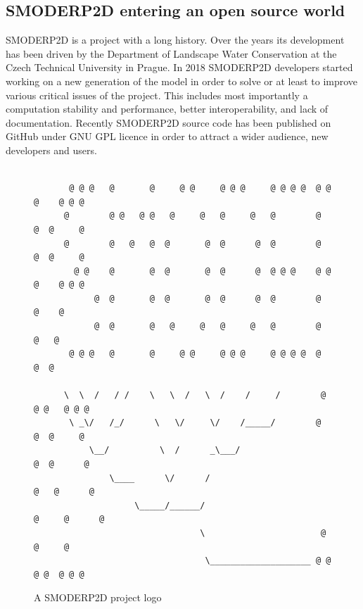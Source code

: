 \subsection{SMODERP2D entering an open source world}\label{ref:open_source_providers}

SMODERP2D is a project with a long history. Over the years its
development has been driven by the Department of Landscape Water
Conservation at the Czech Technical University in Prague. In 2018
SMODERP2D developers started working on a new generation of the model
in order to solve or at least to improve various critical issues of
the project. This includes most importantly a computation stability
and performance, better interoperability, and lack of
documentation. Recently SMODERP2D source code has been published on
GitHub \cite{smoderp2d-github-2019} under GNU GPL licence in order to
attract a wider audience, new developers and users.

\begin{figure}[ht!]
  {\tiny
\begin{verbatim}

       @ @ @   @       @     @ @     @ @ @     @ @ @ @  @ @ @    @ @ @
      @        @ @   @ @   @     @   @     @   @        @     @  @     @
      @        @   @   @  @       @  @      @  @        @     @  @     @
        @ @    @       @  @       @  @      @  @ @ @    @ @ @    @ @ @
            @  @       @  @       @  @      @  @        @   @    @
            @  @       @   @     @   @     @   @        @    @   @
       @ @ @   @       @     @ @     @ @ @     @ @ @ @  @     @  @

      \  \  /   / /    \   \  /   \  /    /     /        @ @ @   @ @ @
       \ _\/   /_/      \   \/     \/    /_____/        @     @  @     @
           \__/          \  /      _\___/                     @  @      @
               \____      \/      /                          @   @      @
                    \_____/______/                         @     @      @
                                 \                       @       @     @
                                  \____________________ @ @ @ @  @ @ @
\end{verbatim}
}
\caption{A SMODERP2D project logo}
\label{fig:smoderp2d_logo}
\end{figure}

